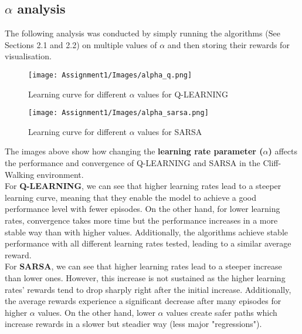 \documentclass[11pt,a4paper]{article}
\begin{document}
\subsection{$\alpha$ analysis}

The following analysis was conducted by simply running the algorithms (See Sections 2.1 and 2.2) on multiple values of $\alpha$ and then storing their rewards for visualisation.

\begin{figure}[h!]
    \centering
    \begin{minipage}{0.47\textwidth}
        \centering
        \texttt{[image: Assignment1/Images/alpha\_q.png]}
        \caption{Learning curve for different $\alpha$ values for Q-LEARNING}
        \label{fig:fig1}
    \end{minipage}%
    \hfill
    \begin{minipage}{0.47\textwidth}
        \centering
        \texttt{[image: Assignment1/Images/alpha\_sarsa.png]}
        \caption{Learning curve for different $\alpha$ values for SARSA}
        \label{fig:fig2}
    \end{minipage}
\end{figure}

\vline

The images above show how changing the \textbf{learning rate parameter ($\alpha$)} affects the performance and convergence of Q-LEARNING and SARSA in the Cliff-Walking environment.\\

For \textbf{Q-LEARNING}, we can see that higher learning rates lead to a steeper learning curve, meaning that they enable the model to achieve a good performance level with fewer episodes. On the other hand, for lower learning rates, convergence takes more time but the performance increases in a more stable way than with higher values. Additionally, the algorithms achieve stable performance with all different learning rates tested, leading to a similar average reward. \\

For \textbf{SARSA}, we can see that higher learning rates lead to a steeper increase than lower ones. However, this increase is not sustained as the higher learning rates' rewards tend to drop sharply right after the initial increase. Additionally, the average rewards experience a significant decrease after many episodes for higher $\alpha$ values. On the other hand, lower $\alpha$
values create safer paths which increase rewards in a slower but steadier way (less major "regressions"). \\
\end{document}
